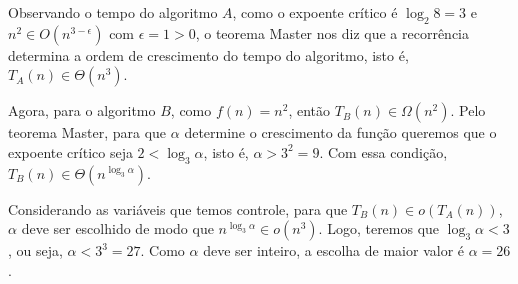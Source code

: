 Observando o tempo do algoritmo $A$, como o expoente crítico é $\log_2 8 = 3$ e $n^2 \in O\left(n^{3 - \epsilon}\right)$ com $\epsilon = 1 > 0$, o teorema Master nos diz que a recorrência determina a ordem de crescimento do tempo do algoritmo, isto é, $T_A(n) \in \Theta\left(n^3\right)$.

Agora, para o algoritmo $B$, como $f(n) = n^2$, então $T_B(n) \in \Omega\left(n^2\right)$. Pelo teorema Master, para que $\alpha$ determine o crescimento da função queremos que o expoente crítico seja $2 < \log_3 \alpha$, isto é, $\alpha > 3^2 = 9$. Com essa condição, $T_B(n) \in \Theta\left(n^{\log_3 \alpha}\right)$.

Considerando as variáveis que temos controle, para que $T_B(n) \in o\left(T_A(n)\right)$, $\alpha$ deve ser escolhido de modo que $n^{\log_3 \alpha} \in o\left(n^3\right)$. Logo, teremos que $\log_3 \alpha < 3$, ou seja, $\alpha < 3^3 = 27$. Como $\alpha$ deve ser inteiro, a escolha de maior valor é $\alpha = 26$.
